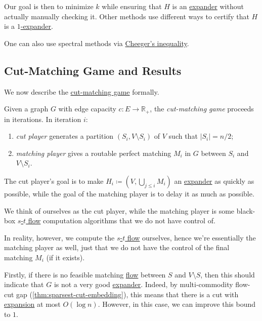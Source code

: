 Our goal is then to minimize \(k\) while ensuring that \(H\) is an \hyperref[def:expander]{expander} without actually manually checking it. Other methods use different ways to certify that \(H\) is a \hyperref[def:expander]{\(1\)-expander}.

\begin{eg}
	One can also use spectral methods via \hyperref[thm:Cheeger-inequality]{Cheeger's inequality}.
\end{eg}

\subsection{Cut-Matching Game and Results}
We now describe the \hyperref[def:cut-matching-game]{cut-matching game} formally.

\begin{definition}\label{def:cut-matching-game}
	Given a graph \(G\) with edge capacity \(c\colon E \to \mathbb{R} _{+}\), the \emph{cut-matching game} proceeds in iterations. In iteration \(i\):
	\begin{enumerate}
		\item \emph{cut player} generates a partition \((S_i, V\setminus S_i)\) of \(V\) such that \(\lvert S_i \rvert = n / 2\);
		\item \emph{matching player} gives a routable perfect matching \(M_i\) in \(G\) between \(S_i\) and \(V \setminus S_i\).
	\end{enumerate}
	The cut player's goal is to make \(H_i \coloneqq (V, \bigcup_{j \leq i} M_i)\) an \hyperref[def:expander]{expander} as quickly as possible, while the goal of the matching player is to delay it as much as possible.
\end{definition}

We think of ourselves as the cut player, while the matching player is some black-box \hyperref[prb:s-t-max-flow]{\(s\)-\(t\) flow} computation algorithms that we do not have control of.

\begin{intuition}
	In reality, however, we compute the \hyperref[prb:s-t-max-flow]{\(s\)-\(t\) flow} ourselves, hence we're essentially the matching player as well, just that we do not have the control of the final matching \(M_i\) (if it exists).
\end{intuition}

Firstly, if there is no feasible matching \hyperref[def:flow]{flow} between \(S\) and \(V\setminus S\), then this should indicate that \(G\) is not a very good \hyperref[def:expander]{expander}. Indeed, by multi-commodity flow-cut gap (\autoref{thm:sparsest-cut-embedding}), this means that there is a cut with \hyperref[def:expansion]{expansion} at most \(O(\log n)\). However, in this case, we can improve this bound to \(1\).

